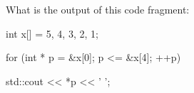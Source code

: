 What is the output of this code fragment:



\begin{consolethree}[escapeinside=||]

int x[] = {5, 4, 3, 2, 1};

for (int * p = &x[0]; p <= &x[4]; ++p)

{

    std::cout << *p << ' ';

}

\end{consolethree}

